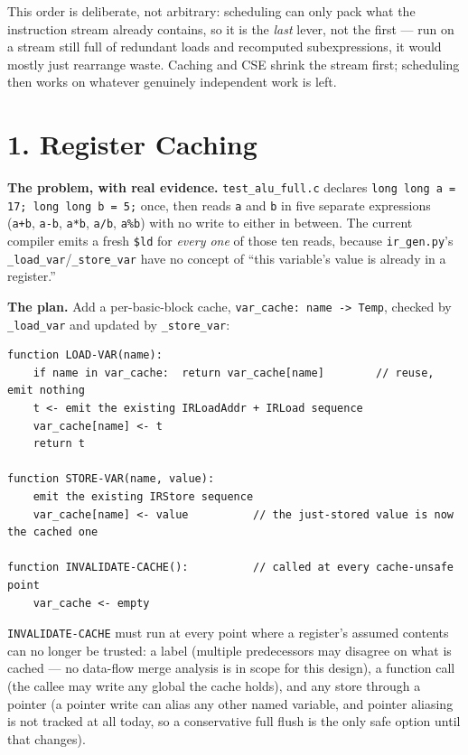 \documentclass[11pt,a4paper]{article}
\begin{document}
This order is deliberate, not arbitrary: scheduling can only pack what the instruction
stream already contains, so it is the \emph{last} lever, not the first --- run on a
stream still full of redundant loads and recomputed subexpressions, it would mostly just
rearrange waste. Caching and CSE shrink the stream first; scheduling then works on
whatever genuinely independent work is left.

\section{1. Register Caching}

\textbf{The problem, with real evidence.} \texttt{test\_alu\_full.c} declares
\texttt{long long a = 17; long long b = 5;} once, then reads \texttt{a} and \texttt{b} in
five separate expressions (\texttt{a+b}, \texttt{a-b}, \texttt{a*b}, \texttt{a/b},
\texttt{a\%b}) with no write to either in between. The current compiler emits a fresh
\texttt{\$ld} for \emph{every one} of those ten reads, because
\texttt{ir\_gen.py}'s \texttt{\_load\_var}/\texttt{\_store\_var} have no concept of ``this
variable's value is already in a register.''

\textbf{The plan.} Add a per-basic-block cache, \texttt{var\_cache: name -> Temp}, checked
by \texttt{\_load\_var} and updated by \texttt{\_store\_var}:
\begin{lstlisting}[caption={Register caching --- the rule, not yet implemented}]
function LOAD-VAR(name):
    if name in var_cache:  return var_cache[name]        // reuse, emit nothing
    t <- emit the existing IRLoadAddr + IRLoad sequence
    var_cache[name] <- t
    return t

function STORE-VAR(name, value):
    emit the existing IRStore sequence
    var_cache[name] <- value          // the just-stored value is now the cached one

function INVALIDATE-CACHE():          // called at every cache-unsafe point
    var_cache <- empty
\end{lstlisting}
\texttt{INVALIDATE-CACHE} must run at every point where a register's assumed contents can
no longer be trusted: a label (multiple predecessors may disagree on what is cached --- no
data-flow merge analysis is in scope for this design), a function call (the callee may
write any global the cache holds), and any store through a pointer (a pointer write can
alias any other named variable, and pointer aliasing is not tracked at all today, so a
conservative full flush is the only safe option until that changes).
\end{document}
